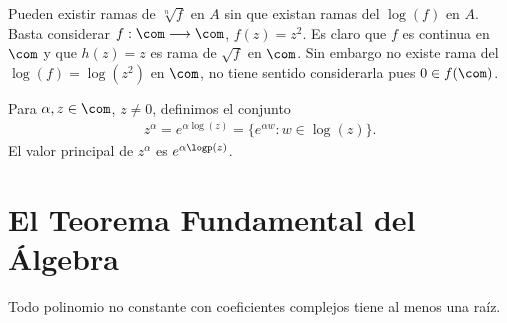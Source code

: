 \begin{obs}
Pueden existir ramas de $\sqrt[n]{f}$ en $A$ sin que existan ramas del $\log(f)$ en $A$.
\\
\newline
Basta considerar $f: \com \longrightarrow \com$, $f(z) = z^2$. Es claro que $f$ es continua en $\com$ y que $h(z) = z$ es rama de $\sqrt{f}$ en $\com$. Sin embargo no existe rama del $\log(f) = \log(z^2)$ en $\com$, no tiene sentido considerarla pues $0 \in f(\com)$.
\end{obs}

\begin{defi}
Para $\alpha, z \in \com$, $z \not = 0$, definimos el conjunto
\begin{align*}
    z^{\alpha} = e^{\alpha \log(z)} = \{e^{\alpha w} : w \in \log(z) \}.
\end{align*}
El valor principal de $z^{\alpha}$ es $e^{\alpha \logp(z)}$.
\end{defi}

\section{El Teorema Fundamental del Álgebra}

\begin{teo}
Todo polinomio no constante con coeficientes complejos tiene al menos una raíz.
\end{teo}

